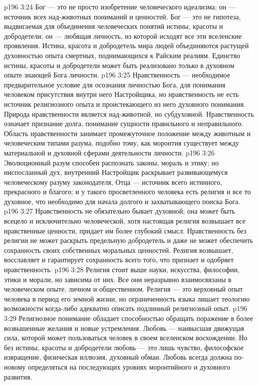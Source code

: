 \vs p196 3:24 Бог --- это не просто изобретение человеческого идеализма; он --- источник всех над\hyp{}животных пониманий и ценностей. Бог --- это не гипотеза, выдвигаемая для объединения человеческих понятий истины, красоты и добродетели; он --- любящая личность, из которой исходят все эти вселенские проявления. Истина, красота и добродетель мира людей объединяются растущей духовностью опыта смертных, поднимающихся к Райским реалиям. Единство истины, красоты и добродетели может быть реализовано только в духовном опыте знающей Бога личности.
\vs p196 3:25 Нравственность --- необходимое предварительное условие для осознания личностью Бога, для понимания человеком присутствия внутри него Настройщика, но нравственность не есть источник религиозного опыта и проистекающего из него духовного понимания. Природа нравственности является над\hyp{}животной, но субдуховной. Нравственность означает признание долга, понимание сущности правильного и неправильного. Область нравственности занимает промежуточное положение между животным и человеческим типами разума, подобно тому, как моронтия существует между материальной и духовной сферами деятельности личности.
\vs p196 3:26 Эволюционный разум способен распознать законы, мораль и этику; но ниспосланный дух, внутренний Настройщик раскрывает развивающемуся человеческому разуму законодателя, Отца --- источник всего истинного, прекрасного и благого; и у такого просветленного человека есть религия и все то духовное, что необходимо для начала долгого и захватывающего поиска Бога.
\vs p196 3:27 Нравственность не обязательно бывает духовной; она может быть всецело и исключительно человеческой, хотя настоящая религия возвышает все нравственные ценности, придает им более глубокий смысл. Нравственность без религии не может раскрыть предельную добродетель и даже не может обеспечить сохранность своих собственных моральных ценностей. Религия возвышает, восславляет и гарантирует сохранность всего того, что признает и одобряет нравственность.
\vs p196 3:28 Религия стоит выше науки, искусства, философии, этики и морали, но зависима от них. Все они неразрывно взаимосвязаны в человеческом опыте, личном и общественном. Религия --- это верховный опыт человека в период его земной жизни, но ограниченность языка лишает теологию возможности когда\hyp{}либо адекватно описать подлинный религиозный опыт.
\vs p196 3:29 \pc Религиозное понимание обладает способностью обращать поражение в более возвышенные желания и новые устремления. Любовь --- наивысшая движущая сила, которой может пользоваться человек в своем вселенском восхождении. Но без истины, красоты и добродетели любовь --- это лишь чувство, философское извращение, физическая иллюзия, духовный обман. Любовь всегда должна по\hyp{}новому определяться на последующих уровнях моронтийного и духовного развития.

